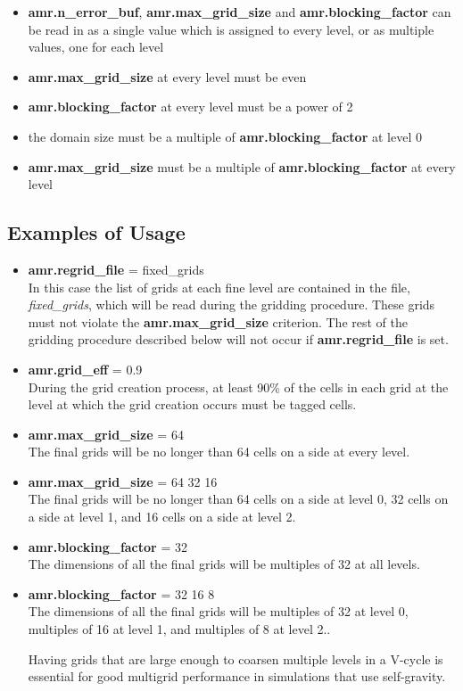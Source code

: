 \begin{itemize}
\item {\bf amr.n\_error\_buf}, {\bf amr.max\_grid\_size} and {\bf amr.blocking\_factor} 
can be read in as a single value which is assigned to every level, 
or as multiple values, one for each level
\item {\bf amr.max\_grid\_size} at every level must be even 
\item {\bf amr.blocking\_factor} at every level must be a power of 2
\item the domain size must be a multiple of  {\bf amr.blocking\_factor} at level 0
\item {\bf amr.max\_grid\_size} must be a multiple of {\bf amr.blocking\_factor} at every level
\end{itemize}

\subsection{Examples of Usage}

\begin{itemize} 

\item {\bf amr.regrid\_file} = fixed\_grids \\ 
In this case the list of grids at each fine level are contained in the file, {\em fixed\_grids},
which will be read during the gridding procedure.  These grids must not violate the
{\bf amr.max\_grid\_size} criterion.   The rest of the gridding procedure described below
will not occur if {\bf amr.regrid\_file} is set.

\item {\bf amr.grid\_eff} = 0.9\\ 
During the grid creation process, at least 90\% of the cells in each grid at the
level at which the grid creation occurs must be tagged cells.  

\item {\bf amr.max\_grid\_size} = 64 \\ 
The final grids will be no longer than 64 cells on a side at every level.

\item {\bf amr.max\_grid\_size} = 64 32 16 \\ 
The final grids will be no longer than 64 cells on a side
at level 0, 32 cells on a side at level 1, and 16 cells on a side at level 2.

\item {\bf amr.blocking\_factor} = 32 \\
The dimensions of all the final grids will be multiples of 32 at all levels.

\item {\bf amr.blocking\_factor} = 32 16 8\\
The dimensions of all the final grids will be multiples of 32
at level 0, multiples of 16 at level 1, and multiples of 8 at level 2..  

Having grids that are large enough to coarsen multiple levels in a V-cycle is essential
for good multigrid performance in simulations that use self-gravity.

\end{itemize}

